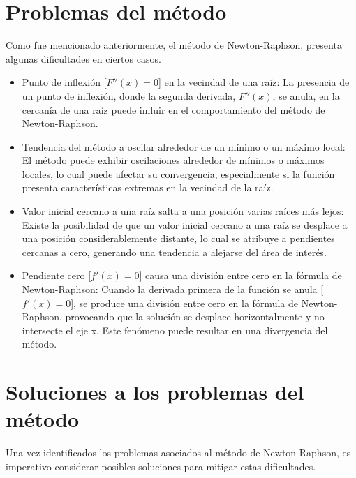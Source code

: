 \documentclass[conference]{IEEEtran}
\begin{document}
\section{Problemas del método}

Como fue mencionado anteriormente, el método de Newton-Raphson, presenta
algunas dificultades en ciertos casos.

\begin{itemize}
	\item Punto de inflexión [$F''(x) = 0$] en la vecindad de una raíz:
	      La presencia de un punto de inflexión, donde la segunda derivada,
	      $F''(x)$, se anula, en la cercanía de una raíz puede influir en
	      el comportamiento del método de Newton-Raphson.

	\item Tendencia del método a oscilar alrededor de un mínimo o un
	      máximo local:
	      El método puede exhibir oscilaciones alrededor de mínimos o
	      máximos locales, lo cual puede afectar su convergencia,
	      especialmente si la función presenta características extremas
	      en la vecindad de la raíz.

	\item Valor inicial cercano a una raíz salta a una posición varias
	      raíces más lejos:
	      Existe la posibilidad de que un valor inicial cercano a una raíz
	      se desplace a una posición considerablemente distante, lo cual
	      se atribuye a pendientes cercanas a cero, generando una tendencia
	      a alejarse del área de interés.

	\item Pendiente cero [$f'(x) = 0$] causa una división entre cero
	      en la fórmula de Newton-Raphson:
	      Cuando la derivada primera de la función se anula [$f'(x) = 0$], se
	      produce una división entre cero en la fórmula de Newton-Raphson,
	      provocando que la solución se desplace horizontalmente y no
	      intersecte el eje x. Este fenómeno puede resultar en una
	      divergencia del método.
\end{itemize}

\section{Soluciones a los problemas del método}

Una vez identificados los problemas asociados al método de Newton-Raphson, es
imperativo considerar posibles soluciones para mitigar estas dificultades.
\end{document}
